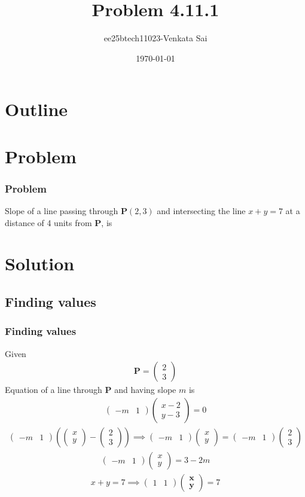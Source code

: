 \documentclass{beamer}
\title{Problem 4.11.1}
\author{ee25btech11023-Venkata Sai}
\date{\today}
\providecommand{\brak}[1]{\ensuremath{\left(#1\right)}}
\theoremstyle{remark}
\newcommand{\myvec}[1]{\ensuremath{\begin{pmatrix}#1\end{pmatrix}}}
\let\vec\mathbf
\numberwithin{equation}{section}
\begin{document}
\begin{frame}
\titlepage
\end{frame}

\section*{Outline}
\begin{frame}
\tableofcontents
\end{frame}

\section{Problem}

\begin{frame}
\frametitle{Problem}
\setcounter{section}{1}
Slope of a line passing through $\vec{P}\brak{2,3}$ and intersecting the line $x+y=7$ at a distance of 4 units from $\vec{P}$, is
\end{frame}
\section{Solution}

\subsection{Finding values}
\begin{frame}
\frametitle{Finding values}
Given  
\begin{align}
\vec{P}=\myvec{2\\3}
\end{align}
Equation of a line through $\vec{P}$ and having slope $m$ is
\begin{align}
 \myvec{-m & 1}\myvec{x-2 \\ y-3}=0  
 \end{align}
 \begin{align}
 \myvec{-m & 1}\brak{\myvec{x\\y}-\myvec{2\\3}} \implies \myvec{-m & 1}\myvec{x\\y}=\myvec{-m & 1}\myvec{2\\3}
\end{align}
\begin{align}
\myvec{-m & 1}\myvec{x\\y}=3-2m
\end{align}
\begin{align}
  x+y=7 \implies  \myvec{1 & 1}\myvec{\vec{x}\\\vec{y}}=7
\end{align}
\end{frame}
\end{document}
